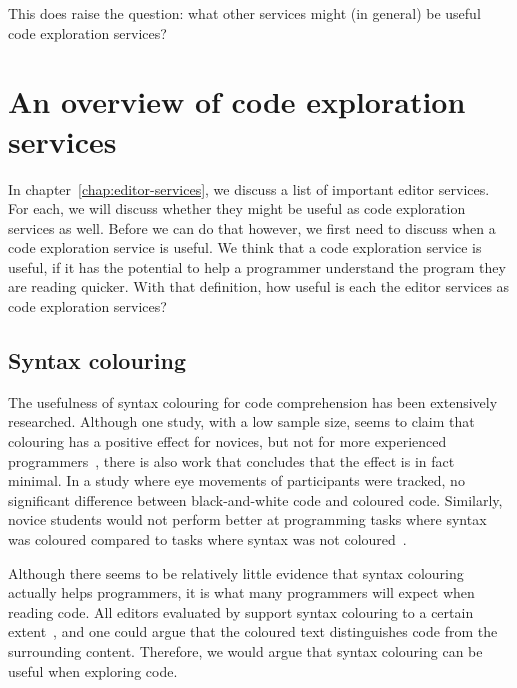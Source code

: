 This does raise the question: what other services might (in general) be useful code exploration services?

\section{An overview of code exploration services}\label{sec:an-overview-of-code-exploration-services}

In chapter~\ref{chap:editor-services}, we discuss a list of important editor services.
For each, we will discuss whether they might be useful as code exploration services as well.
Before we can do that however, we first need to discuss when a code exploration service is useful.
We think that a code exploration service is useful, if it has the potential to help a programmer understand the program they are reading quicker.
With that definition, how useful is each the editor services as code exploration services?

\subsection*{Syntax colouring}

The usefulness of syntax colouring for code comprehension has been extensively researched.
Although one study, with a low sample size, seems to claim that colouring has a positive effect for novices, but not for
more experienced programmers~\autocite{Sarkar15a-0}, there is also work that concludes that the effect is in fact minimal.
In a study where eye movements of participants were tracked, no significant difference between black-and-white code and coloured code\autocite{beelders2016syntax}.
Similarly, novice students would not perform better at programming tasks where syntax was coloured compared to tasks where syntax was not coloured~\autocite{HannebauerHG18}.

Although there seems to be relatively little evidence that syntax colouring actually helps programmers, it is what many programmers will expect when reading code.
All editors evaluated by \citeauthor{Pelsmaeker2018} support syntax colouring to a certain extent~\autocite{Pelsmaeker2018},
and one could argue that the coloured text distinguishes code from the surrounding content.
Therefore, we would argue that syntax colouring can be useful when exploring code.

